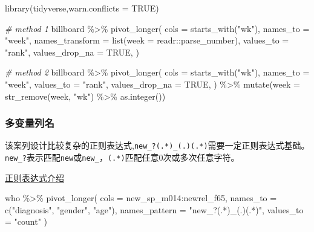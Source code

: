 \documentclass[
]{book}
\newenvironment{Shaded}{\begin{snugshade}}{\end{snugshade}}
\newcommand{\AttributeTok}[1]{\textcolor[rgb]{0.77,0.63,0.00}{#1}}
\newcommand{\CommentTok}[1]{\textcolor[rgb]{0.56,0.35,0.01}{\textit{#1}}}
\newcommand{\ConstantTok}[1]{\textcolor[rgb]{0.00,0.00,0.00}{#1}}
\newcommand{\FunctionTok}[1]{\textcolor[rgb]{0.00,0.00,0.00}{#1}}
\newcommand{\NormalTok}[1]{#1}
\newcommand{\SpecialCharTok}[1]{\textcolor[rgb]{0.00,0.00,0.00}{#1}}
\newcommand{\StringTok}[1]{\textcolor[rgb]{0.31,0.60,0.02}{#1}}
\begin{document}
\begin{Shaded}
\begin{Highlighting}[]
\FunctionTok{library}\NormalTok{(tidyverse,}\AttributeTok{warn.conflicts =} \ConstantTok{TRUE}\NormalTok{)}

\CommentTok{\# method 1}
\NormalTok{billboard }\SpecialCharTok{\%\textgreater{}\%} 
  \FunctionTok{pivot\_longer}\NormalTok{(}
    \AttributeTok{cols =} \FunctionTok{starts\_with}\NormalTok{(}\StringTok{"wk"}\NormalTok{), }
    \AttributeTok{names\_to =} \StringTok{"week"}\NormalTok{, }
    \AttributeTok{names\_transform =} \FunctionTok{list}\NormalTok{(}\AttributeTok{week =}\NormalTok{ readr}\SpecialCharTok{::}\NormalTok{parse\_number),}
    \AttributeTok{values\_to =} \StringTok{"rank"}\NormalTok{,}
    \AttributeTok{values\_drop\_na =} \ConstantTok{TRUE}\NormalTok{,}
\NormalTok{)}

\CommentTok{\# method 2}
\NormalTok{billboard }\SpecialCharTok{\%\textgreater{}\%}
  \FunctionTok{pivot\_longer}\NormalTok{(}
    \AttributeTok{cols =} \FunctionTok{starts\_with}\NormalTok{(}\StringTok{"wk"}\NormalTok{),}
    \AttributeTok{names\_to =} \StringTok{"week"}\NormalTok{,}
    \AttributeTok{values\_to =} \StringTok{"rank"}\NormalTok{,}
    \AttributeTok{values\_drop\_na =} \ConstantTok{TRUE}\NormalTok{,}
\NormalTok{  ) }\SpecialCharTok{\%\textgreater{}\%}
  \FunctionTok{mutate}\NormalTok{(}\AttributeTok{week =} \FunctionTok{str\_remove}\NormalTok{(week, }\StringTok{"wk"}\NormalTok{) }\SpecialCharTok{\%\textgreater{}\%} \FunctionTok{as.integer}\NormalTok{())}
\end{Highlighting}
\end{Shaded}

\hypertarget{ux591aux53d8ux91cfux5217ux540d}{%
\subsubsection{多变量列名}\label{ux591aux53d8ux91cfux5217ux540d}}

该案列设计比较复杂的正则表达式,\texttt{new\_?(.*)\_(.)(.*)}需要一定正则表达式基础。
\texttt{new\_?}表示匹配\texttt{new}或\texttt{new\_}，\texttt{(.*)}匹配任意0次或多次任意字符。

\href{https://www.runoob.com/regexp/regexp-syntax.html}{正则表达式介绍}

\begin{Shaded}
\begin{Highlighting}[]
\NormalTok{who }\SpecialCharTok{\%\textgreater{}\%} \FunctionTok{pivot\_longer}\NormalTok{(}
  \AttributeTok{cols =}\NormalTok{ new\_sp\_m014}\SpecialCharTok{:}\NormalTok{newrel\_f65,}
  \AttributeTok{names\_to =} \FunctionTok{c}\NormalTok{(}\StringTok{"diagnosis"}\NormalTok{, }\StringTok{"gender"}\NormalTok{, }\StringTok{"age"}\NormalTok{), }
  \AttributeTok{names\_pattern =} \StringTok{"new\_?(.*)\_(.)(.*)"}\NormalTok{,}
  \AttributeTok{values\_to =} \StringTok{"count"}
\NormalTok{)}
\end{Highlighting}
\end{Shaded}
\end{document}
